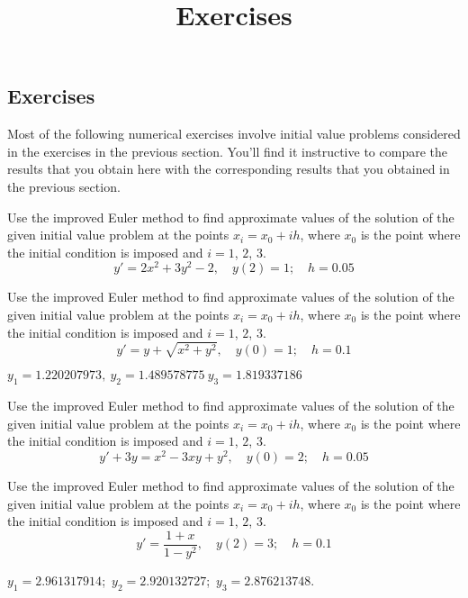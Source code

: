 \documentclass{ximera}
\title{Exercises} \license{CC BY-NC-SA 4.0}
\begin{document}
\begin{abstract}
\end{abstract}
\maketitle

\begin{onlineOnly}
\section*{Exercises}
\end{onlineOnly}

Most of the following numerical exercises involve initial value
problems considered in the exercises in the previous section. You'll
find it instructive to compare the results that you obtain here with
the corresponding results that you obtained in the previous section.

\begin{problem}\label{exer:3.2.1} Use the improved Euler method to find approximate values of the solution of the given initial value problem at the points $x_i=x_0+ih$, where $x_0$ is the point where
the initial condition is imposed and $i=1$, $2$, $3$.
$$y'=2x^2+3y^2-2,\quad y(2)=1;\quad h=0.05$$
\end{problem}

\begin{problem}\label{exer:3.2.2} Use the improved Euler method to find approximate values of the solution of the given initial value problem at the points $x_i=x_0+ih$, where $x_0$ is the point where
the initial condition is imposed and $i=1$, $2$, $3$.
$$y'=y+\sqrt{x^2+y^2},\quad y(0)=1;\quad h=0.1$$

\begin{solution}
$y_1=1.220207973,\ y_2=1.489578775\ y_3=1.819337186$
\end{solution}
\end{problem}

\begin{problem}\label{exer:3.2.3} Use the improved Euler method to find approximate values of the solution of the given initial value problem at the points $x_i=x_0+ih$, where $x_0$ is the point where
the initial condition is imposed and $i=1$, $2$, $3$.
$$y'+3y=x^2-3xy+y^2,\quad y(0)=2;\quad h=0.05$$
\end{problem}

\begin{problem}\label{exer:3.2.4} Use the improved Euler method to find approximate values of the solution of the given initial value problem at the points $x_i=x_0+ih$, where $x_0$ is the point where
the initial condition is imposed and $i=1$, $2$, $3$.
$$y'=\frac{1+x}{1-y^2},\quad y(2)=3;\quad h=0.1$$

\begin{solution}
    $y_1=2.961317914$;\ $y_2=2.920132727$;\ $y_3=2.876213748$.
\end{solution}
\end{problem}
\end{document}
